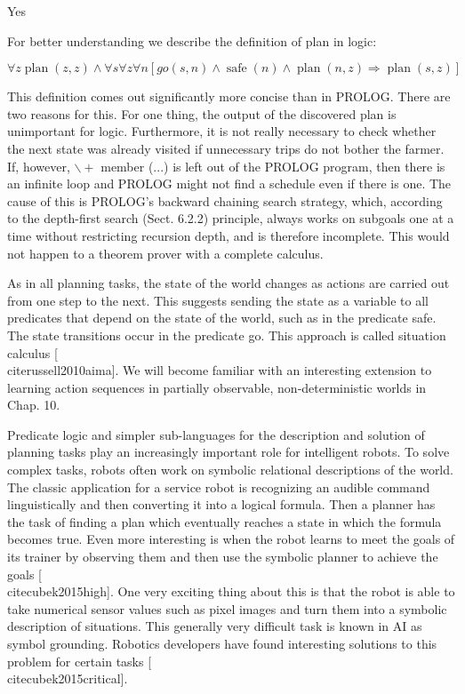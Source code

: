 \documentclass[10pt]{book}
\begin{document}
Yes

For better understanding we describe the definition of plan in logic:

$$
\forall z \operatorname{plan}(z, z) \wedge \forall s \forall z \forall n[g o(s, n) \wedge \operatorname{safe}(n) \wedge \operatorname{plan}(n, z) \Rightarrow \operatorname{plan}(s, z)]
$$

This definition comes out significantly more concise than in PROLOG. There are two reasons for this. For one thing, the output of the discovered plan is unimportant for logic. Furthermore, it is not really necessary to check whether the next state was already visited if unnecessary trips do not bother the farmer. If, however, $\backslash+$ member (...) is left out of the PROLOG program, then there is an infinite loop and PROLOG might not find a schedule even if there is one. The cause of this is PROLOG's backward chaining search strategy, which, according to the depth-first search (Sect. 6.2.2) principle, always works on subgoals one at a time without restricting recursion depth, and is therefore incomplete. This would not happen to a theorem prover with a complete calculus.

As in all planning tasks, the state of the world changes as actions are carried out from one step to the next. This suggests sending the state as a variable to all predicates that depend on the state of the world, such as in the predicate safe. The state transitions occur in the predicate go. This approach is called situation calculus [\\cite{russell2010aima}]. We will become familiar with an interesting extension to learning action sequences in partially observable, non-deterministic worlds in Chap. 10.

Predicate logic and simpler sub-languages for the description and solution of planning tasks play an increasingly important role for intelligent robots. To solve complex tasks, robots often work on symbolic relational descriptions of the world. The classic application for a service robot is recognizing an audible command linguistically and then converting it into a logical formula. Then a planner has the task of finding a plan which eventually reaches a state in which the formula becomes true. Even more interesting is when the robot learns to meet the goals of its trainer by observing them and then use the symbolic planner to achieve the goals [\\cite{cubek2015high}]. One very exciting thing about this is that the robot is able to take numerical sensor values such as pixel images and turn them into a symbolic description of situations. This generally very difficult task is known in AI as symbol grounding. Robotics developers have found interesting solutions to this problem for certain tasks [\\cite{cubek2015critical}].
\end{document}
